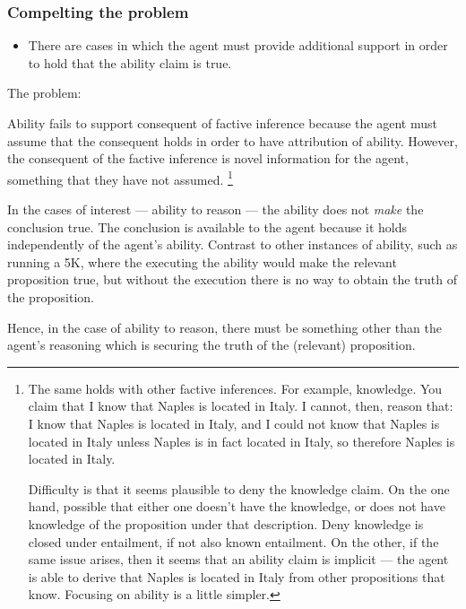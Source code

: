 \documentclass[10pt]{article}
\begin{document}
\subsubsection{Compelting the problem}
\label{sec:compelting-problem}

\begin{itemize}
\item There are cases in which the agent must provide additional support in order to hold that the ability claim is true.
\end{itemize}

The problem:

Ability fails to support consequent of factive inference because the agent must assume that the consequent holds in order to have attribution of ability.
However, the consequent of the factive inference is novel information for the agent, something that they have not assumed.\nolinebreak
\footnote{
  The same holds with other factive inferences.
  For example, knowledge.
  You claim that I know that Naples is located in Italy.
  I cannot, then, reason that:
  I know that Naples is located in Italy, and I could not know that Naples is located in Italy unless Naples is in fact located in Italy, so therefore Naples is located in Italy.

  Difficulty is that it seems plausible to deny the knowledge claim.
  On the one hand, possible that either one doesn't have the knowledge, or does not have knowledge of the proposition under that description.
  Deny knowledge is closed under entailment, if not also known entailment.
  On the other, if the same issue arises, then it seems that an ability claim is implicit --- the agent is able to derive that Naples is located in Italy from other propositions that know.
  Focusing on ability is a little simpler.
}

\begin{note}
  In the cases of interest --- ability to reason --- the ability does not \emph{make} the conclusion true.
  The conclusion is available to the agent because it holds independently of the agent's ability.
  Contrast to other instances of ability, such as running a 5K, where the executing the ability would make the relevant proposition true, but without the execution there is no way to obtain the truth of the proposition.

  Hence, in the case of ability to reason, there must be something other than the agent's reasoning which is securing the truth of the (relevant) proposition.
\end{note}
\end{document}

